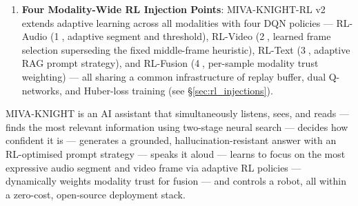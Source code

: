 \documentclass[12pt,a4paper]{article}
\theoremstyle{definition}
\theoremstyle{plain}
\theoremstyle{remark}
\begin{document}
\begin{enumerate}
  \item \textbf{Four Modality-Wide RL Injection Points}: MIVA-KNIGHT-RL v2 extends adaptive learning across all modalities with four DQN policies --- RL-Audio (\textcircled{1}, adaptive segment and threshold), RL-Video (\textcircled{2}, learned frame selection superseding the fixed middle-frame heuristic), RL-Text (\textcircled{3}, adaptive RAG prompt strategy), and RL-Fusion (\textcircled{4}, per-sample modality trust weighting) --- all sharing a common infrastructure of replay buffer, dual Q-networks, and Huber-loss training (see \S\ref{sec:rl_injections}).
\end{enumerate}

\begin{tcolorbox}[laymanbox,title={One-Sentence Summary}]
MIVA-KNIGHT is an AI assistant that simultaneously listens, sees, and reads --- finds the most relevant information using two-stage neural search --- decides how confident it is --- generates a grounded, hallucination-resistant answer with an RL-optimised prompt strategy --- speaks it aloud --- learns to focus on the most expressive audio segment and video frame via adaptive RL policies --- dynamically weights modality trust for fusion --- and controls a robot, all within a zero-cost, open-source deployment stack.
\end{tcolorbox}
\end{document}
